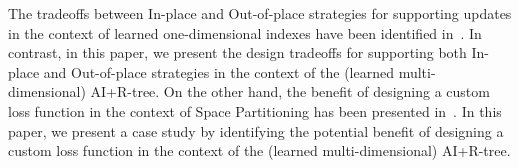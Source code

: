 The tradeoffs between In-place and Out-of-place strategies for supporting updates in the context of learned one-dimensional indexes have been identified in~\cite{chatterjee2024limousine}. In contrast, in this paper, we present the design tradeoffs for supporting both In-place and Out-of-place strategies in the context of the (learned multi-dimensional) AI+R-tree. On the other hand, the benefit of designing a custom loss function in the context of Space Partitioning has been presented in~\cite{fahim2023unsupervised}. In this paper, we present a case study by identifying the potential benefit of designing a custom loss function in the context of the (learned multi-dimensional) AI+R-tree.